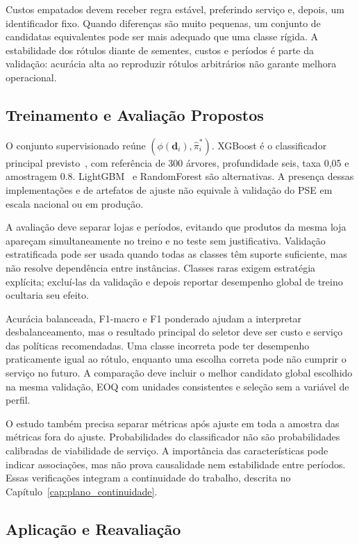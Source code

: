 Custos empatados devem receber regra estável, preferindo serviço e, depois, um identificador fixo. Quando diferenças são muito pequenas, um conjunto de candidatas equivalentes pode ser mais adequado que uma classe rígida. A estabilidade dos rótulos diante de sementes, custos e períodos é parte da validação: acurácia alta ao reproduzir rótulos arbitrários não garante melhora operacional.

\subsection{Treinamento e Avaliação Propostos}

O conjunto supervisionado reúne $(\phi(\mathbf d_i),\hat\pi_i^*)$. XGBoost é o classificador principal previsto~\citep{ChenGuestrin2016XGBoost}, com referência de 300 árvores, profundidade seis, taxa 0,05 e amostragem 0.8. LightGBM~\citep{Ke2017LightGBM} e RandomForest são alternativas. A presença dessas implementações e de artefatos de ajuste não equivale à validação do PSE em escala nacional ou em produção.

A avaliação deve separar lojas e períodos, evitando que produtos da mesma loja apareçam simultaneamente no treino e no teste sem justificativa. Validação estratificada pode ser usada quando todas as classes têm suporte suficiente, mas não resolve dependência entre instâncias. Classes raras exigem estratégia explícita; excluí-las da validação e depois reportar desempenho global de treino ocultaria seu efeito.

Acurácia balanceada, F1-macro e F1 ponderado ajudam a interpretar desbalanceamento, mas o resultado principal do seletor deve ser custo e serviço das políticas recomendadas. Uma classe incorreta pode ter desempenho praticamente igual ao rótulo, enquanto uma escolha correta pode não cumprir o serviço no futuro. A comparação deve incluir o melhor candidato global escolhido na mesma validação, EOQ com unidades consistentes e seleção sem a variável de perfil.

O estudo também precisa separar métricas após ajuste em toda a amostra das métricas fora do ajuste. Probabilidades do classificador não são probabilidades calibradas de viabilidade de serviço. A importância das características pode indicar associações, mas não prova causalidade nem estabilidade entre períodos. Essas verificações integram a continuidade do trabalho, descrita no Capítulo~\ref{cap:plano_continuidade}.

\subsection{Aplicação e Reavaliação}
\label{sec:aplicacao_aipe}

